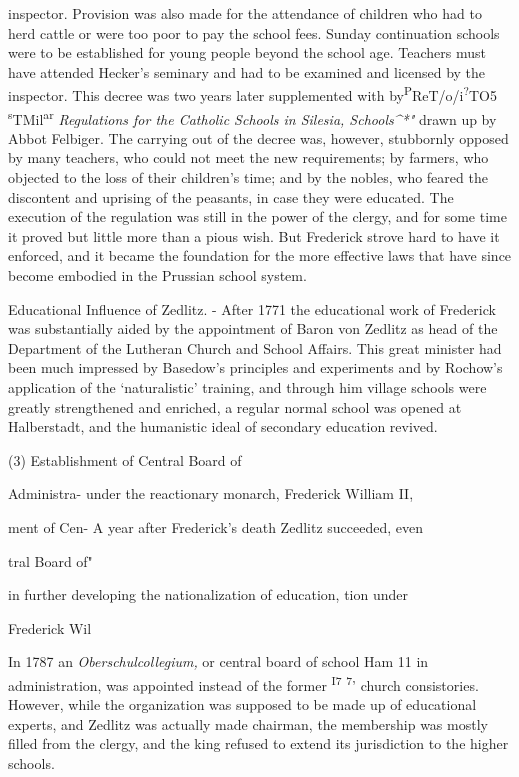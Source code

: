 \documentclass[
]{book}
\begin{document}
inspector. Provision was also made for the attendance of children who had to herd cattle or were too poor to pay the school fees. Sunday continuation schools were to be established for young people beyond the school age. Teachers must have attended Hecker's seminary and had to be examined and licensed by the inspector. This decree was two years later supplemented with by\textsuperscript{P}ReT/o/i\textsuperscript{?}TO5 \textsuperscript{s}TMil\textsuperscript{ar} \emph{Regulations for the Catholic Schools in Silesia, Schools\^{}*"} drawn up by Abbot Felbiger. The carrying out of the decree was, however, stubbornly opposed by many teachers, who could not meet the new requirements; by farmers, who objected to the loss of their children's time; and by the nobles, who feared the discontent and uprising of the peasants, in case they were educated. The execution of the regulation was still in the power of the clergy, and for some time it proved but little more than a pious wish. But Frederick strove hard to have it enforced, and it became the foundation for the more effective laws that have since become embodied in the Prussian school system.

Educational Influence of Zedlitz. - After 1771 the educational work of Frederick was substantially aided by the appointment of Baron von Zedlitz as head of the Department of the Lutheran Church and School Affairs. This great minister had been much impressed by Basedow's principles and experiments and by Rochow's application of the `naturalistic' training, and through him village schools were greatly strengthened and enriched, a regular normal school was opened at Halberstadt, and the humanistic ideal of secondary education revived.

(3) Establishment of Central Board of

Administra- under the reactionary monarch, Frederick William II,

ment of Cen- A year after Frederick's death Zedlitz succeeded, even

tral Board of"

in further developing the nationalization of education, tion under

Frederick Wil

In 1787 an \emph{Oberschulcollegium,} or central board of school Ham 11 in administration, was appointed instead of the former \textsuperscript{I7} \textsuperscript{7}' church consistories. However, while the organization was supposed to be made up of educational experts, and Zedlitz was actually made chairman, the membership was mostly filled from the clergy, and the king refused to extend its jurisdiction to the higher schools.
\end{document}
